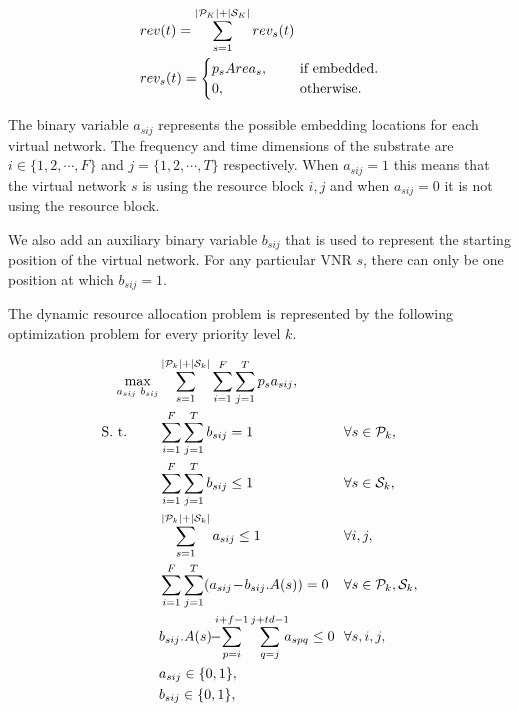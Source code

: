 \documentclass[conference]{IEEEtran}
\begin{document}
\begin{align}
\label{eqn11}
& rev(t) = \sum_{s=1}^{|\mathcal{P}_K|+|\mathcal{S}_K|} rev_s(t) \\
\label{eqn12}
& rev_s(t) =\begin{cases}
    p_{s} Area_s, & \hspace{5mm} \text{if embedded}.\\
    0,  & \hspace{5mm} \text{otherwise}.
  \end{cases}
\end{align}


The binary variable $a_{sij}$ represents the possible embedding locations for each virtual network. The frequency and time dimensions of the substrate are $i \in \{1, 2, \cdots, F\}$  and $j = \{1, 2, \cdots, T\}$ respectively. When $a_{sij} = 1$ this means that the virtual network $s$ is using the resource block $i, j$ and when $a_{sij} = 0$ it is not using the resource block.

We also add an auxiliary binary variable $b_{sij}$ that is used to represent the starting position of the virtual network. For any particular VNR $s$, there can only be one position at which $b_{sij} = 1$.

The dynamic resource allocation problem is represented by the following optimization problem for every priority level $k$.

\begin{subequations}\label{grp}
\begin{align}
\label{eqn1}
 \max_{a_{sij} \hspace{1mm} b_{sij}} &  \sum_{s=1}^{|\mathcal{P}_k|+|\mathcal{S}_k|} \sum_{i=1}^{F}  \sum_{j=1}^{T} p_s a_{sij}, &&   \\
\label{eqn2}
  \text{S. t.} \hspace{8mm} &  \sum_{i=1}^{F}\sum_{j=1}^{T} b_{sij} = 1 && \forall s \in \mathcal{P}_k, \\
\label{eqn3}
 &  \sum_{i=1}^{F}\sum_{j=1}^{T} b_{sij} \leq 1 && \forall s \in \mathcal{S}_k, \\
\label{eqn4}
 &  \sum_{s=1}^{|\mathcal{P}_k|+|\mathcal{S}_k|} a_{sij} \leq 1 && \forall i, j,  \\
\label{eqn5}
 &  \sum_{i=1}^{F}\sum_{j=1}^{T}(a_{sij} \!- \!b_{sij}.A(s)) = 0 && \forall s \in \mathcal{P}_k, \mathcal{S}_k , \\
\label{eqn6}
 &   b_{sij}.A(s) \!\!-\!\!\!\! \sum_{p=i}^{i+f-1} \sum_{q=j}^{j+td-1}\!\!\!a_{spq} \leq 0 \! \!&& \forall s, i, j, \\
\label{eqn7}
 &  a_{sij} \in \{0, 1\}, & \\
\label{eqn8}
 &  b_{sij} \in \{0, 1\}, &
\end{align}
\end{subequations}
\end{document}
